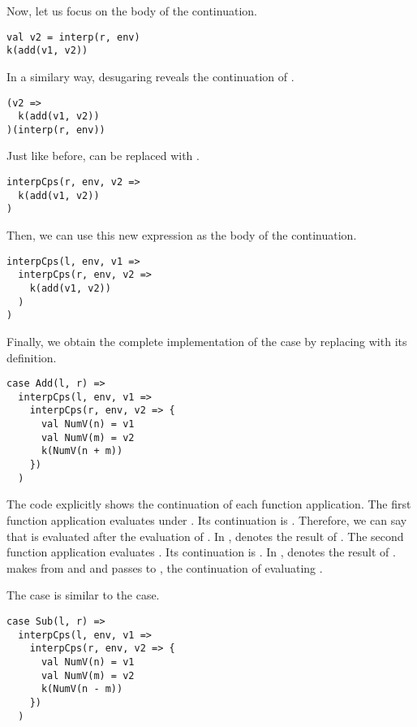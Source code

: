 Now, let us focus on the body of the continuation.

\begin{verbatim}
val v2 = interp(r, env)
k(add(v1, v2))
\end{verbatim}

In a similary way, desugaring reveals the continuation of .

\begin{verbatim}
(v2 =>
  k(add(v1, v2))
)(interp(r, env))
\end{verbatim}

Just like before,  can be replaced with .

\begin{verbatim}
interpCps(r, env, v2 =>
  k(add(v1, v2))
)
\end{verbatim}

Then, we can use this new expression as the body of the continuation.

\begin{verbatim}
interpCps(l, env, v1 =>
  interpCps(r, env, v2 =>
    k(add(v1, v2))
  )
)
\end{verbatim}

Finally, we obtain the complete implementation of the  case by
replacing  with its definition.

\begin{verbatim}
case Add(l, r) =>
  interpCps(l, env, v1 =>
    interpCps(r, env, v2 => {
      val NumV(n) = v1
      val NumV(m) = v2
      k(NumV(n + m))
    })
  )
\end{verbatim}

The code explicitly shows the continuation of each function application.
The first function application evaluates  under . Its
continuation is .
Therefore, we can say that  is evaluated after the evaluation of
. In ,
 denotes the result of . The second function application
evaluates . Its continuation
is . In , 
denotes the result of .  makes 
from  and  and passes  to , the
continuation of evaluating .

The  case is similar to the  case.

\begin{verbatim}
case Sub(l, r) =>
  interpCps(l, env, v1 =>
    interpCps(r, env, v2 => {
      val NumV(n) = v1
      val NumV(m) = v2
      k(NumV(n - m))
    })
  )
\end{verbatim}

